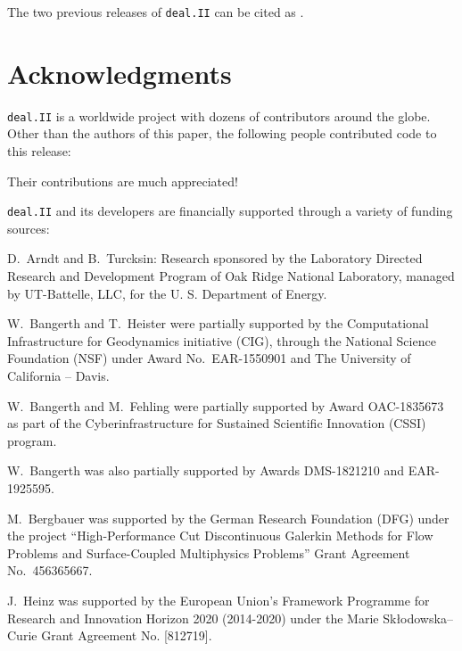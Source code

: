\documentclass{ansarticle-preprint}
\newcommand{\specialword}[1]{\texttt{#1}}
\newcommand{\dealii}{{\specialword{deal.II}}\xspace}
\begin{document}
The two previous releases of \dealii can be cited as
\cite{dealII92,dealII93}.


\section{Acknowledgments}

\dealii is a worldwide project with dozens of contributors around the
globe. Other than the authors of this paper, the following people
contributed code to this release:\\
%
%




Their contributions are much appreciated!


\bigskip

\dealii and its developers are financially supported through a
variety of funding sources:


D.~Arndt and B.~Turcksin: Research sponsored by the Laboratory Directed Research and
Development Program of Oak Ridge National Laboratory, managed by UT-Battelle,
LLC, for the U. S. Department of Energy.

W.~Bangerth and T.~Heister were partially
supported by the Computational Infrastructure for Geodynamics initiative
(CIG), through the National Science Foundation (NSF) under Award
No.~EAR-1550901 and The University of California -- Davis.

W.~Bangerth and M.~Fehling were partially supported by Award OAC-1835673
as part of the Cyberinfrastructure for Sustained Scientific Innovation (CSSI)
program.

W.~Bangerth was also partially supported by Awards DMS-1821210 and EAR-1925595.

M.~Bergbauer was supported by the German Research Foundation (DFG) under the
project ``High-Performance Cut Discontinuous Galerkin Methods for Flow
Problems and Surface-Coupled Multiphysics Problems'' Grant Agreement
No.~456365667.

J.~Heinz was supported by the European Union’s Framework Programme for Research
and Innovation Horizon 2020 (2014-2020) under the Marie Sk\l{}odowska--Curie Grant
Agreement No. [812719].
\end{document}
